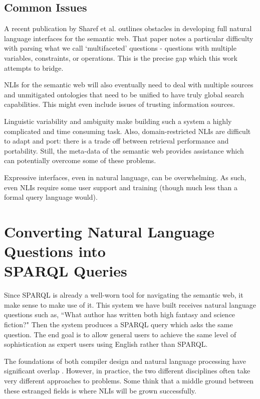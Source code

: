 \documentclass[11pt]{article}
\begin{document}
\subsection{Common Issues}
A recent publication by Sharef et al. \cite{issues} outlines obstacles in developing full
natural language interfaces for the semantic web. That paper notes a particular
difficulty with parsing what we call `multifaceted' questions - questions with multiple
variables, constraints, or operations. This is the precise gap which this work
attempts to bridge.

NLIs for the semantic web will also eventually need to deal with multiple sources
and unmitigated ontologies that need to be unified to have truly global search
capabilities\cite{issues}. This might even include issues of trusting information
sources\cite{semantic}.

Linguistic variability and ambiguity make building such a
system a highly complicated and time consuming task. Also,
domain-restricted NLIs are difficult to adapt and port:
there is a trade off between retrieval performance and portability. 
Still, the meta-data of the semantic web provides assistance
which can potentially overcome some of these problems. \cite{usability}

Expressive interfaces, even in natural language, can be overwhelming.
As such, even NLIs require some user support and training (though much less than
a formal query language would). \cite{usability}

\section{Converting Natural Language Questions into \\SPARQL Queries}
Since SPARQL is already a well-worn tool for navigating the semantic
web, it make sense to make use of it. This system we have built receives natural language
questions such as, ``What author has written both high fantasy and science fiction?"
Then the system produces a SPARQL query which asks the same question. 
The end goal is to allow general users to achieve the same level of sophistication
as expert users using English rather than SPARQL.

The foundations of both compiler design and natural language processing
have significant overlap \cite{chomsky, reghizzi}.
However, in practice, the two different disciplines often take very different approaches to 
problems\cite{aho, anatomy, reghizzi}.
Some think \cite{usability} that a middle ground between these estranged fields is where
NLIs will be grown successfully.
\end{document}
